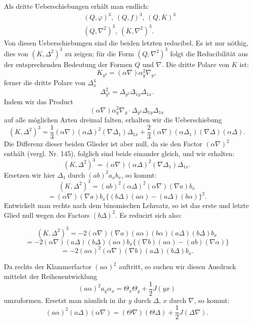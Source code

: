 \documentclass[11pt]{article}
\providecommand{\weberpage}[1]{}
\let\Delta\varDelta
\let\Theta\varTheta
\begin{document}
Als dritte Ueberschiebungen erhält man endlich:
\[
\begin{aligned}
&(Q,\varphi)^3, \ (Q,f)^3, \ (Q,K)^3\\
&(Q,\nabla^2)^3, \ (K,\nabla^2)^3.
\end{aligned}
\]
Von diesen Ueberschiebungen sind die beiden letzten reducibel. Es ist nur
nöthig, dies von $(K,\Delta^2)^3$ zu zeigen; für die Form $(Q,\nabla^2)^3$
folgt die Reducibilität aus der entsprechenden Bedeutung der Formen $Q$
und $\nabla$. Die dritte Polare von $K$ ist:
\[
K_{y^3} = (\alpha\nabla)\alpha_y^2\nabla_y,
\]
ferner die dritte Polare von $\Delta_x^4$
\[
\Delta_{y^3}^2 = \Delta_{y^2}\Delta_{1y}\Delta_{1x}.
\]
Indem wir das Product
\[
(\alpha\nabla)\alpha_y^2\nabla_y\cdot \Delta_{y^2}\Delta_{1y}\Delta_{1x}
\]
auf alle möglichen Arten dreimal falten, erhalten wir die Ueberschiebung
\[
(K,\Delta^2)^3 = \frac{1}{3}(\alpha\nabla)(\alpha\Delta)^2(\nabla\Delta_1)\Delta_{1x} + \frac{2}{3}(\alpha\nabla)(\alpha\Delta_1)(\nabla\Delta)(\alpha\Delta).
\]
Die Differenz dieser beiden Glieder ist aber null, da sie den Factor
$(\alpha\nabla)^2$ enthält (vergl. Nr. 145), folglich sind beide einander
gleich, und wir erhalten:
\[
(K,\Delta^2)^3 = (\alpha\nabla)(\alpha\Delta)^2(\nabla\Delta_1)\Delta_{1x}.
\]
Ersetzen wir hier $\Delta_1$ durch $(ab)^2a_xb_x$, so kommt:
\[
(K,\Delta^2)^3 = (ab)^2(\alpha\Delta)^2(\alpha\nabla)(\nabla a)b_x
\]
\[
= (\alpha\nabla)(\nabla a)b_x\{(b\Delta)(a\alpha) - (a\Delta)(b\alpha)\}^2.
\]
Entwickelt man rechts nach dem binomischen Lehrsatz, so ist das erste und
letzte Glied null wegen des Factors $(b\Delta)^2$. Es reducirt sich also:


\weberpage{333}

\[
(K, \Delta^2)^3 = -2(\alpha\nabla)(\nabla a)(a\alpha)(b\alpha)(a\Delta)(b\Delta)b_x
\]
\[
= -2(\alpha\nabla)(a\Delta)(b\Delta)(a\alpha)b_x\{(\nabla b)(a\alpha)-(ab)(\nabla\alpha)\}
\]
\[
= -2(a\alpha)^2(\alpha\nabla)(\nabla b)(a\Delta)(b\Delta)b_x.
\]

Da rechts der Klammerfactor $(a\alpha)^2$ auftritt, so suchen wir diesen
Ausdruck mittelst der Reihenentwicklung
\[
(a\alpha)^2 a_y\alpha_x = \Theta_x\Theta_y + \frac{1}{2}J(yx)
\]
umzuformen. Ersetzt man nämlich in ihr $y$ durch $\Delta$, $x$ durch $\nabla$,
so kommt:
\[
(a\alpha)^2(a\Delta)(\alpha\nabla) = (\Theta\nabla)(\Theta\Delta) + \frac{1}{2}J(\Delta\nabla).
\]
\end{document}

